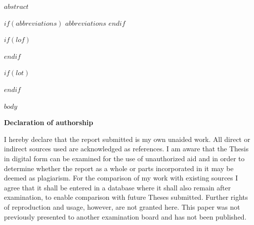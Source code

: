 \documentclass[12pt]{article}
\begin{document}
\newpage
$abstract$

\newpage
\tableofcontents
\clearpage

$if(abbreviations)$
\newpage
$abbreviations$
$endif$

$if(lof)$
\newpage
\listoffigures
{}
$endif$

$if(lot)$
\newpage
\listoftables
{}
$endif$

\newpage
\pagestyle{plain}
\setcounter{page}{1}    %

$body$



\RaggedRight


\newpage



\Large
\noindent
\textbf{Declaration of authorship}
\vspace{0.5cm}
\noindent
\normalsize

I hereby declare that the report submitted is my own unaided work. All direct
or indirect sources used are acknowledged as references. I am aware that the
Thesis in digital form can be examined for the use of unauthorized aid and in
order to determine whether the report as a whole or parts incorporated in it may
be deemed as plagiarism. For the comparison of my work with existing sources I
agree that it shall be entered in a database where it shall also remain after
examination, to enable comparison with future Theses submitted. Further rights
of reproduction and usage, however, are not granted here. This paper was not
previously presented to another examination board and has not been published.
\\
\end{document}
